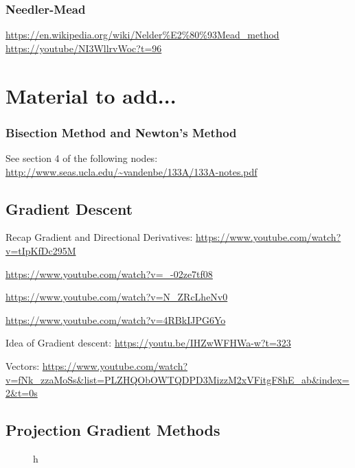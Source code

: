 \documentclass[../open-optimization/open-optimization.tex]{subfiles}
\begin{document}
\subsection{Needler-Mead}

\url{https://en.wikipedia.org/wiki/Nelder%E2%80%93Mead_method}
\url{https://youtube/NI3WllrvWoc?t=96}





\chapter{Material to add...}

\subsection{Bisection Method and Newton's Method}
See section 4 of the following nodes:
\url{http://www.seas.ucla.edu/~vandenbe/133A/133A-notes.pdf}

\section{Gradient Descent}
Recap Gradient and Directional Derivatives:
\url{https://www.youtube.com/watch?v=tIpKfDc295M}

\url{https://www.youtube.com/watch?v=_-02ze7tf08}

\url{https://www.youtube.com/watch?v=N_ZRcLheNv0}

\url{https://www.youtube.com/watch?v=4RBkIJPG6Yo}




Idea of Gradient descent:
\url{https://youtu.be/IHZwWFHWa-w?t=323}

Vectors:
\url{https://www.youtube.com/watch?v=fNk_zzaMoSs&list=PLZHQObOWTQDPD3MizzM2xVFitgF8hE_ab&index=2&t=0s}





\section{Projection Gradient Methods}
\begin{figure}{h}

\end{figure}
\end{document}

